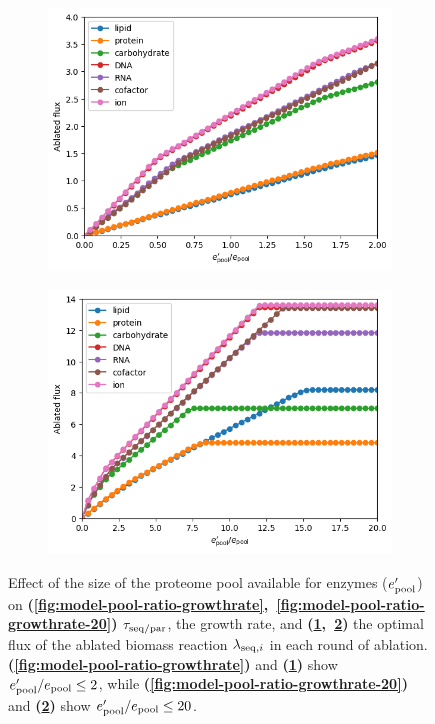 \begin{figure}[htb!]
  \begin{subfigure}[htpb]{0.45\textwidth}
   \centering
   \includegraphics[width=\textwidth]{epool_ec_components}
   \caption{
   }
   \label{fig:model-pool-ablated}
  \end{subfigure}%
  \begin{subfigure}[htpb]{0.45\textwidth}
   \centering
   \includegraphics[width=\textwidth]{epool_ec_components_20}
   \caption{
   }
   \label{fig:model-pool-ablated-20}
  \end{subfigure}

  \caption[
    Effect of the size of the proteome pool available for enzymes
  ]{
    Effect of the size of the proteome pool available for enzymes ($e_{\mathrm{pool}}^{\prime}$) on \textbf{(\ref{fig:model-pool-ratio-growthrate},~\ref{fig:model-pool-ratio-growthrate-20})} $\tau_{\mathrm{seq}/\mathrm{par}}$, the growth rate, and \textbf{(\ref{fig:model-pool-ablated},~\ref{fig:model-pool-ablated-20})} the optimal flux of the ablated biomass reaction $\lambda_{\mathrm{seq},i}$ in each round of ablation.
    \textbf{(\ref{fig:model-pool-ratio-growthrate})} and \textbf{(\ref{fig:model-pool-ablated})} show $e_{\mathrm{pool}}^{\prime}/e_{\mathrm{pool}} \leq 2$, while
    \textbf{(\ref{fig:model-pool-ratio-growthrate-20})} and \textbf{(\ref{fig:model-pool-ablated-20})} show $e_{\mathrm{pool}}^{\prime}/e_{\mathrm{pool}} \leq 20$.
  }
  \label{fig:model-pool}
\end{figure}


